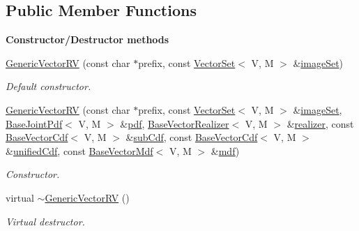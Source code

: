 \subsection*{Public Member Functions}
\begin{Indent}{\bf Constructor/\-Destructor methods}\par
\begin{DoxyCompactItemize}
\item 
\hyperlink{class_q_u_e_s_o_1_1_generic_vector_r_v_a2590066cf4f18479ad7639478a991ecb}{Generic\-Vector\-R\-V} (const char $\ast$prefix, const \hyperlink{class_q_u_e_s_o_1_1_vector_set}{Vector\-Set}$<$ V, M $>$ \&\hyperlink{class_q_u_e_s_o_1_1_base_vector_r_v_aa4dd2f036228eac1f945bacc7147a922}{image\-Set})
\begin{DoxyCompactList}\small\item\em Default constructor. \end{DoxyCompactList}\item 
\hyperlink{class_q_u_e_s_o_1_1_generic_vector_r_v_ae7d3b5d67bcb07406aa65a39e9be25df}{Generic\-Vector\-R\-V} (const char $\ast$prefix, const \hyperlink{class_q_u_e_s_o_1_1_vector_set}{Vector\-Set}$<$ V, M $>$ \&\hyperlink{class_q_u_e_s_o_1_1_base_vector_r_v_aa4dd2f036228eac1f945bacc7147a922}{image\-Set}, \hyperlink{class_q_u_e_s_o_1_1_base_joint_pdf}{Base\-Joint\-Pdf}$<$ V, M $>$ \&\hyperlink{class_q_u_e_s_o_1_1_base_vector_r_v_a3206740e05e0c64a88273029e963b185}{pdf}, \hyperlink{class_q_u_e_s_o_1_1_base_vector_realizer}{Base\-Vector\-Realizer}$<$ V, M $>$ \&\hyperlink{class_q_u_e_s_o_1_1_base_vector_r_v_aea4b01eef0baf36944d14459a7b9ccf4}{realizer}, const \hyperlink{class_q_u_e_s_o_1_1_base_vector_cdf}{Base\-Vector\-Cdf}$<$ V, M $>$ \&\hyperlink{class_q_u_e_s_o_1_1_base_vector_r_v_a905586dc1529a3ae7dd7f04313ca9e8a}{sub\-Cdf}, const \hyperlink{class_q_u_e_s_o_1_1_base_vector_cdf}{Base\-Vector\-Cdf}$<$ V, M $>$ \&\hyperlink{class_q_u_e_s_o_1_1_base_vector_r_v_a045a14e1ee948ac3162199a06606ce80}{unified\-Cdf}, const \hyperlink{class_q_u_e_s_o_1_1_base_vector_mdf}{Base\-Vector\-Mdf}$<$ V, M $>$ \&\hyperlink{class_q_u_e_s_o_1_1_base_vector_r_v_a81f6ade1c28022b813d1276f2c217404}{mdf})
\begin{DoxyCompactList}\small\item\em Constructor. \end{DoxyCompactList}\item 
virtual \hyperlink{class_q_u_e_s_o_1_1_generic_vector_r_v_a5d897ccef62540e85395eb89af657f05}{$\sim$\-Generic\-Vector\-R\-V} ()
\begin{DoxyCompactList}\small\item\em Virtual destructor. \end{DoxyCompactList}\end{DoxyCompactItemize}
\end{Indent}
